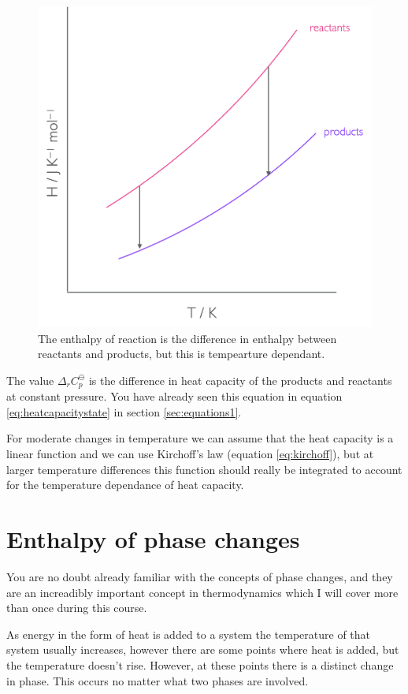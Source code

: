 \documentclass[
]{book}
\begin{document}
\begin{figure}

{\centering \includegraphics[width=0.7\linewidth]{images/enthalpytemp} 

}

\caption{The enthalpy of reaction is the difference in enthalpy between reactants and products, but this is tempearture dependant.}\label{fig:enthalpytemp}
\end{figure}

The value \(\Delta_r C_p^{\ominus}\) is the difference in heat capacity of the products and reactants at constant pressure. You have already seen this equation in equation \eqref{eq:heatcapacitystate} in section \ref{sec:equations1}.

For moderate changes in temperature we can assume that the heat capacity is a linear function and we can use Kirchoff's law (equation \eqref{eq:kirchoff}), but at larger temperature differences this function should really be integrated to account for the temperature dependance of heat capacity.

\hypertarget{enthalpy-of-phase-changes}{%
\section{Enthalpy of phase changes}\label{enthalpy-of-phase-changes}}

You are no doubt already familiar with the concepts of phase changes, and they are an increadibly important concept in thermodynamics which I will cover more than once during this course.

As energy in the form of heat is added to a system the temperature of that system usually increases, however there are some points where heat is added, but the temperature doesn't rise. However, at these points there is a distinct change in phase. This occurs no matter what two phases are involved.
\end{document}
